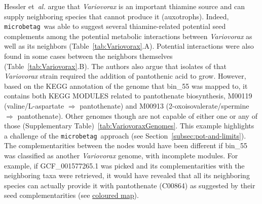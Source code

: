 \documentclass[sn-mathphys,Numbered]{sn-jnl}  %
\theoremstyle{thmstyleone}%
\theoremstyle{thmstyletwo}%
\theoremstyle{thmstylethree}%
\newcommand{\microbetag}{\texttt{microbetag}}
\begin{document}
        Hessler et~\textit{al.} argue that \textit{Variovorax} is an important thiamine source and can supply neighboring species that cannot produce it (auxotrophs). 
        Indeed, \microbetag~was able to suggest several thiamine-related potential seed complements among the potential metabolic interactions between \textit{Variovorax} as well as its neighbors (Table~\ref{tab:Variovorax}.A). 
        Potential interactions were also found in some cases between the neighbors themselves (Table~\ref{tab:Variovorax}.B).
        The authors also argue that isolates of that \textit{Variovorax} strain required the addition of pantothenic acid to grow. 
        However, based on the KEGG annotation of the genome that bin\_55 was mapped to, it contains both KEGG MODULES related to pantothenate biosynthesis,  
        M00119 (valine/L-aspartate $\Rightarrow$ pantothenate) and 
        M00913 (2-oxoisovalerate/spermine $\Rightarrow$ pantothenate).
        Other genomes though are not capable of either one or any of those (Supplementary Table)~\ref{tab:VariovoraxGenomes}.
        This example highlights a challenge of the \microbetag~approach (see Section~\ref{subsec:pot-and-limits}). 
        The complementarities between the nodes would have been different if bin\_55 was classified as another \textit{Variovorax} genome, with incomplete modules. 
        For example, if GCF\_001577265.1 was picked and its complementarities with the neighboring taxa were retrieved, it would have revealed that all its neighboring species can actually provide it with pantothenate (C00864) as suggested by their seed complementarities (see
        \href{https://www.kegg.jp/kegg-bin/show_pathway?map00770/C00049%20skyblue%2Cblue/C00099%20skyblue%2Cblue/C00141%20skyblue%2Cblue/C00966%20skyblue%2Cblue/C00010%20skyblue%2Cblue/C00882%20skyblue%2Cblue/C01134%20skyblue%2Cblue/C03492%20skyblue%2Cblue/C04352%20skyblue%2Cblue/C00099%20skyblue%2Cblue/C00141%20skyblue%2Cblue/C00966%20skyblue%2Cblue/C05665%20skyblue%2Cblue/C00010%20skyblue%2Cblue/C00141%20skyblue%2Cblue/C00882%20skyblue%2Cblue/C00966%20skyblue%2Cblue/C01134%20skyblue%2Cblue/C03492%20skyblue%2Cblue/C04352%20skyblue%2Cblue/C18911%20skyblue%2Cblue/C00864%09%23ff0000/C00864%09%23ff0000/C00864%09%23ff0000/}{coloured map}). 


\end{document}
